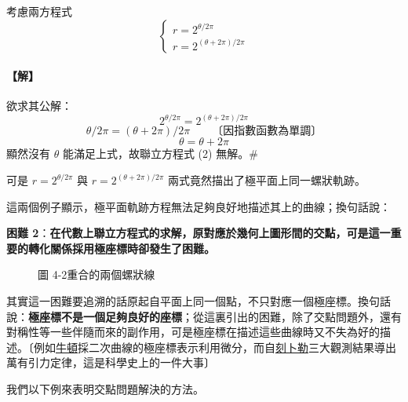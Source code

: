 \medskip
\begin{example}\label{ex:b5s-1-4-2}
考慮兩方程式
\begin{equation}
\begin{cases}
r = 2^{\theta / 2\pi} \\[4pt]
r = 2^{(\theta + 2\pi) / 2\pi}
\end{cases}
\tag{2}
\end{equation}
\end{example}
\paragraph{【解】}
欲求其公解：
\[
2^{\theta / 2\pi} = 2^{(\theta + 2\pi) / 2\pi}
\]
\[
\theta / 2\pi = (\theta + 2\pi) / 2\pi \qquad \text{〔因指數函數為單調〕}
\]
\[
\theta = \theta + 2\pi
\]
顯然沒有 $\theta$ 能滿足上式，故聯立方程式 (2) 無解。\hfill$\#$

可是 $r = 2^{\theta / 2\pi}$ 與 $r = 2^{(\theta + 2\pi) / 2\pi}$ 兩式竟然描出了極平面上同一螺狀軌跡。

這兩個例子顯示，極平面軌跡方程無法足夠良好地描述其上的曲線；換句話說：

\medskip
\noindent\textbf{困難 2}：\textbf{在代數上聯立方程式的求解，原對應於幾何上圖形間的交點，可是這一重要的轉化關係採用極座標時卻發生了困難。}

\begin{figure}[H]
\centering
{}
\caption*{圖 4-2\quad 重合的兩個螺狀線}
\end{figure}

其實這一困難要追溯的話原起自平面上同一個點，不只對應一個極座標。換句話說：\textbf{極座標不是一個足夠良好的座標}；從這裏引出的困難，除了交點問題外，還有對稱性等一些伴隨而來的副作用，可是極座標在描述這些曲線時又不失為好的描述。〔例如\underline{牛頓}採二次曲線的極座標表示利用微分，而自\underline{刻卜勒}三大觀測結果導出萬有引力定律，這是科學史上的一件大事〕

我們以下例來表明交點問題解決的方法。

